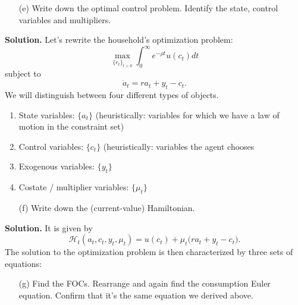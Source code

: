 \documentclass[11pt]{extarticle}
\theoremstyle{plain}
\theoremstyle{definition}
\begin{document}
\vspace{5mm}
\begin{enumerate}
	\item [(e)] Write down the optimal control problem. Identify the state, control variables and multipliers.
\end{enumerate}

\vspace{5mm}
\noindent
\textbf{Solution.} Let's rewrite the household's optimization problem:
\begin{equation*}
	\max_{\{c_t\}_{t>0}} \int_0^\infty e^{-\rho t} u(c_t) dt
\end{equation*}
subject to 
\begin{equation*}
	\dot{a}_t = r a_t + y_t - c_t. 
\end{equation*}
We will distinguish between four different types of objects. 
\begin{enumerate}[1.]
	\item State variables: $\{ a_t\}$ (heuristically: variables for which we have a law of motion in the constraint set)
	
	\item Control variables: $\{c_t\}$ (heuristically: variables the agent chooses
	
	\item Exogenous variables: $\{y_t\}$ 

	\item Costate / multiplier variables: $\{\mu_t\}$
\end{enumerate}



\vspace{5mm}
\begin{enumerate}
	\item [(f)] Write down the (current-value) Hamiltonian.
\end{enumerate}

\vspace{5mm}
\noindent
\textbf{Solution.} It is given by
\begin{equation}
	\mathcal{H}_t(a_t, c_t, y_t, \mu_t) = u(c_t) + \mu_t \bigg( r a_t + y_t - c_t \bigg). 
\end{equation}
The solution to the optimization problem is then characterized by three sets of equations:


\vspace{5mm}
\begin{enumerate}
	\item [(g)] Find the FOCs. Rearrange and again find the consumption Euler equation. Confirm that it's the same equation we derived above. 
\end{enumerate}
\end{document}
